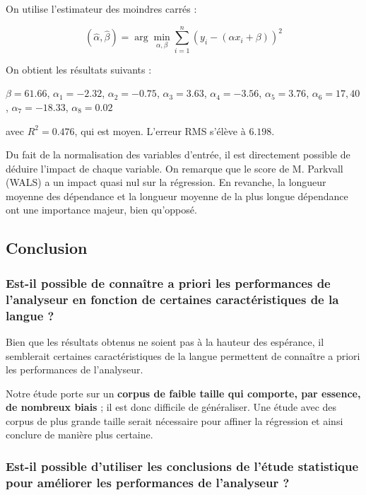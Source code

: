 \documentclass[a4paper, twoside, 12pt]{article}
\begin{document}
    On utilise l'estimateur des moindres carrés :

    \begin{equation*}
(\hat{\alpha}, \hat{\beta})=\arg \min _{\alpha, \beta} \sum_{i=1}^{n}\left(y_{i}-\left(\alpha x_{i}+\beta\right)\right)^{2}
\end{equation*}

On obtient les résultats suivants : \par

$\beta = 61.66 $, $\alpha_1 = -2.32$, $\alpha_2 = -0.75$, $\alpha_3 = 3.63$, $\alpha_4 = -3.56$, $\alpha_5 = 3.76$, $\alpha_6 = 17,40$, $\alpha_7 = -18.33$, $\alpha_8 = 0.02$

avec $R^{2} = 0.476$, qui est moyen. L'erreur RMS s'élève à $6.198$.

    Du fait de la normalisation des variables d'entrée, il est directement possible de déduire l'impact de chaque variable. On remarque que le score de M. Parkvall (WALS) a un impact quasi nul sur la régression. En revanche, la longueur moyenne des dépendance et la longueur moyenne de la plus longue dépendance ont une importance majeur, bien qu'opposé.

    \subsection{Conclusion}

    \subsubsection{Est-il possible de connaître a priori les performances de l’analyseur en fonction de certaines caractéristiques de la langue ?}

    Bien que les résultats obtenus ne soient pas à la hauteur des espérance, il semblerait certaines caractéristiques de la langue permettent de connaître a priori les performances de l’analyseur.

    Notre étude porte sur un \textbf{corpus de faible taille qui comporte, par essence, de nombreux biais} ; il est donc difficile de généraliser. Une étude avec des corpus de plus grande taille serait nécessaire pour affiner la régression et ainsi conclure de manière plus certaine.

    \subsubsection{Est-il possible d’utiliser les conclusions de l’étude statistique pour améliorer les performances de l’analyseur ?}
\end{document}

